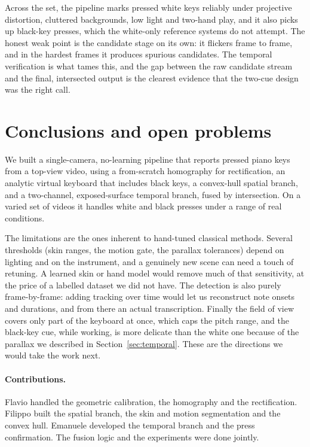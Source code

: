 \documentclass[11pt]{article}
\begin{document}
Across the set, the pipeline marks pressed white keys reliably under projective
distortion, cluttered backgrounds, low light and two-hand play, and it also picks
up black-key presses, which the white-only reference systems do not attempt. The
honest weak point is the candidate stage on its own: it flickers frame to frame,
and in the hardest frames it produces spurious candidates. The temporal
verification is what tames this, and the gap between the raw candidate stream and
the final, intersected output is the clearest evidence that the two-cue design
was the right call.

\section{Conclusions and open problems}
We built a single-camera, no-learning pipeline that reports pressed piano keys
from a top-view video, using a from-scratch homography for rectification, an
analytic virtual keyboard that includes black keys, a convex-hull spatial branch,
and a two-channel, exposed-surface temporal branch, fused by intersection. On a varied set
of videos it handles white and black presses under a range of real conditions.

The limitations are the ones inherent to hand-tuned classical methods. Several
thresholds (skin ranges, the motion gate, the parallax tolerances) depend on
lighting and on the instrument, and a genuinely new scene can need a touch of
retuning. A learned skin or hand model would remove much of that sensitivity, at
the price of a labelled dataset we did not have. The detection is also purely
frame-by-frame: adding tracking over time would let us reconstruct note onsets
and durations, and from there an actual transcription. Finally the field of view
covers only part of the keyboard at once, which caps the pitch range, and the
black-key cue, while working, is more delicate than the white one because of the
parallax we described in Section~\ref{sec:temporal}. These are the directions we
would take the work next.

\paragraph{Contributions.}
Flavio handled the geometric calibration, the homography and the rectification.
Filippo built the spatial branch, the skin and motion segmentation and the convex
hull. Emanuele developed the temporal branch and the press confirmation. The
fusion logic and the experiments were done jointly.



\end{document}
